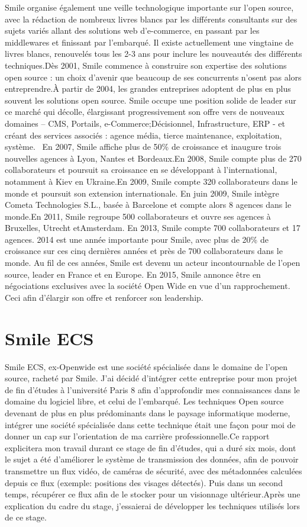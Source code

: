 Smile organise également une veille technologique importante sur l’open source, avec la rédaction de nombreux livres blancs par les différents consultants sur des sujets variés allant des solutions web d’e-commerce, en passant par les middlewares et finissant par l’embarqué. Il existe actuellement une vingtaine de livres blancs, renouvelés tous les 2-3 ans pour inclure les nouveautés des différents techniques.Dès 2001, Smile commence à construire son expertise des solutions open source : un choix d’avenir que beaucoup de ses concurrents n’osent pas alors entreprendre.À partir de 2004, les grandes entreprises adoptent de plus en plus souvent les solutions open source. Smile occupe une position solide de leader sur ce marché qui décolle, élargissant progressivement son offre vers de nouveaux domaines – CMS, Portails, e-Commerce;Décisionnel, Infrastructure, ERP - et créant des services associés : agence média, tierce maintenance, exploitation, système.  En 2007, Smile affiche plus de 50\% de croissance et inaugure trois nouvelles agences à Lyon, Nantes et Bordeaux.En 2008, Smile compte plus de 270 collaborateurs et poursuit sa croissance en se développant à l'international, notamment à Kiev en Ukraine.En 2009, Smile compte 320 collaborateurs dans le monde et poursuit son extension internationale. En juin 2009, Smile intègre Cometa Technologies S.L., basée à Barcelone et compte alors 8 agences dans le monde.En 2011, Smile regroupe 500 collaborateurs et ouvre ses agences à Bruxelles, Utrecht etAmsterdam.
En 2013, Smile compte 700 collaborateurs et 17 agences.
2014 est une année importante pour Smile, avec plus de 20\% de croissance sur ces cinq
dernières années et près de 700 collaborateurs dans le monde. Au fil de ces années, Smile est
devenu un acteur incontournable de l’open source, leader en France et en Europe.
En 2015, Smile annonce être en négociations exclusives avec la société Open Wide en vue
d’un rapprochement. Ceci afin d'élargir son offre et renforcer son leadership.


\section{Smile ECS}
Smile ECS, ex-Openwide est une société spécialisée dans le domaine de l'open source, racheté par Smile. J'ai décidé d'intégrer cette entreprise pour mon projet de fin d'études à l'université Paris 8 afin d'approfondir mes connaissances dans le domaine du logiciel libre, et celui de l'embarqué. Les techniques Open source devenant de plus en plus prédominants dans le paysage informatique moderne, intégrer une société spécialisée dans cette technique était une façon pour moi de donner un cap sur l'orientation de ma carrière professionnelle.Ce rapport explicitera mon travail durant ce stage de fin d'études, qui a duré six mois, dont le sujet a été d'améliorer le système de transmission des données, afin de pouvoir transmettre un flux vidéo, de caméras de sécurité, avec des métadonnées calculées depuis ce flux (exemple: positions des visages détectés). Puis dans un second temps, récupérer ce flux afin de le stocker pour un visionnage ultérieur.Après une explication du cadre du stage, j'essaierai de développer les techniques utilisés lors de ce stage.